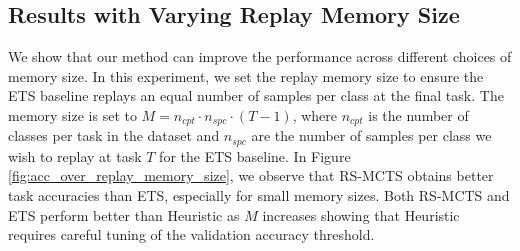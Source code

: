 


\subsection{Results with Varying Replay Memory Size}
\label{sec:results_with_varying_replay_memory_size}
We show that our method can improve the performance across different choices of memory size.
In this experiment, we set the replay memory size to ensure the ETS baseline replays an equal number of samples per class at the final task. 
The memory size is set to $M = n_{cpt} \cdot n_{spc} \cdot (T-1)$, where $n_{cpt}$ is the number of classes per task in the dataset and $n_{spc}$ are the number of samples per class we wish to replay at task $T$ for the ETS baseline. 
In Figure \ref{fig:acc_over_replay_memory_size}, we observe that RS-MCTS obtains better task accuracies than ETS, especially for small memory sizes. Both RS-MCTS and ETS perform better than Heuristic as $M$ increases showing that Heuristic requires careful tuning of the validation accuracy threshold. 




